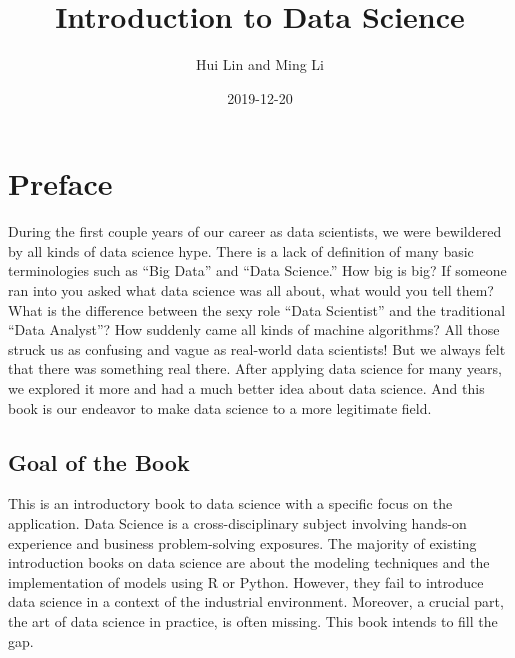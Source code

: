 \documentclass[12pt,]{krantz}
\title{Introduction to Data Science}
\author{Hui Lin and Ming Li}
\date{2019-12-20}
\begin{document}
\maketitle

\thispagestyle{empty}
\begin{center}
\end{center}

\setlength{\abovedisplayskip}{-5pt}
\setlength{\abovedisplayshortskip}{-5pt}

{
\hypersetup{linkcolor=}
\setcounter{tocdepth}{2}
\tableofcontents
}
\listoftables
\listoffigures
\hypertarget{preface}{%
\chapter*{Preface}\label{preface}}


During the first couple years of our career as data scientists, we were bewildered by all kinds of data science hype. There is a lack of definition of many basic terminologies such as ``Big Data'' and ``Data Science.'' How big is big? If someone ran into you asked what data science was all about, what would you tell them? What is the difference between the sexy role ``Data Scientist'' and the traditional ``Data Analyst''? How suddenly came all kinds of machine algorithms? All those struck us as confusing and vague as real-world data scientists! But we always felt that there was something real there. After applying data science for many years, we explored it more and had a much better idea about data science. And this book is our endeavor to make data science to a more legitimate field.

\hypertarget{goal-of-the-book}{%
\section*{Goal of the Book}\label{goal-of-the-book}}


This is an introductory book to data science with a specific focus on the application. Data Science is a cross-disciplinary subject involving hands-on experience and business problem-solving exposures. The majority of existing introduction books on data science are about the modeling techniques and the implementation of models using R or Python. However, they fail to introduce data science in a context of the industrial environment. Moreover, a crucial part, the art of data science in practice, is often missing. This book intends to fill the gap.
\end{document}
